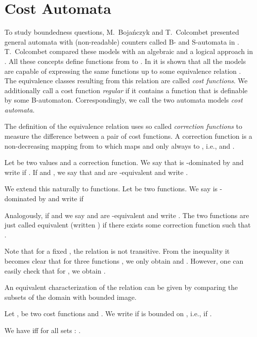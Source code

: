 \documentclass{LMCS}
\begin{document}
\section{Cost Automata}
\label{sec:Preliminaries}



To study boundedness questions, M.~Bojańczyk and T.~Colcombet
presented general automata with (non-readable) counters called B- and
S-automata in \cite{bounds-in-omega-regularity}. T.~Colcombet compared these
models with an algebraic and a logical approach in \cite{regularcostfunctions}.
All these concepts define functions from  to . In 
\cite{regularcostfunctions} it is shown that all the models are capable of 
expressing the same functions up to some equivalence relation . 
The equivalence classes resulting from this relation are called 
\emph{cost functions}. We additionally call a cost function \emph{regular} if
it contains a function that is definable by some B-automaton. Correspondingly,
we call the two automata models \emph{cost automata}.

The definition of the equivalence relation   uses so called
\emph{correction functions} to measure the difference between a pair of cost
functions. A correction function  is a non-decreasing mapping from
 to  which maps  and only  always to ,
i.e.,  and .
\begin{defi}
	Let  be two values and  a correction function. We say that  is -dominated
	by  and write  if . If  
	and , we say that  and  are -equivalent and
	write .

	We extend this naturally  to functions. Let  be 
	two functions. We say  is -dominated by  and write 
	 if 
	
	Analogously, if  and  we say  and  are
	-equivalent and write . The two functions are just
	called equivalent (written ) if there exists some
	correction function  such that .
\end{defi}
Note that for a fixed , the relation  is not transitive.
From the inequality it becomes clear that for three functions , we only obtain  and . However, one can easily check that for , we obtain . 

An equivalent characterization of the relation  can be given by
comparing the subsets of the domain with bounded image. 

\begin{lem}
\label{lem:SecondCostFunctionDefinition}
	Let ,  be two cost functions and . We write
 if  is bounded on , i.e., if . 

We have  iff for all sets : . 
\end{lem}
\end{document}
